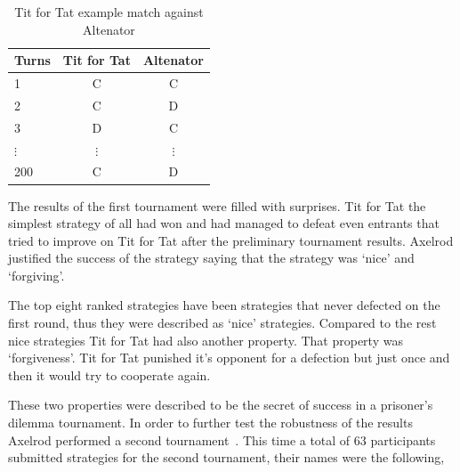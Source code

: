\documentclass{article}
\begin{document}
\begin{table}[!hbtp]
    \begin{center}
    \begin{tabular}{lcc}
        \toprule
        Turns & Tit for Tat & Altenator\\
        \toprule
        1 & C & C\\
        2 & C & D\\
        3 & D & C\\ 
        $\vdots$ & $\vdots$ & $\vdots$ \\ 
        200 & C & D \\
        \bottomrule
    \end{tabular}
    \caption{Tit for Tat example match against Altenator}\label{table:tft_vs_a}
\end{center}
\end{table}

The results of the first tournament were filled with surprises. Tit for Tat the
simplest strategy of all had won and had managed to defeat even entrants that
tried to improve on Tit for Tat after the preliminary tournament results. 
Axelrod justified the success of the strategy saying that the strategy was
`nice' and `forgiving'. 

The top eight ranked strategies have been strategies that never defected on the
first round, thus they were described as `nice' strategies. Compared to the rest
nice strategies Tit for Tat had also another property. That property was 
`forgiveness'. Tit for Tat punished it's opponent for a defection but just once
and then it would try to cooperate again.

These two properties were described to be the secret of success in a prisoner's
dilemma tournament. In order to further test the robustness of the results
Axelrod performed a second tournament~\cite{Axelrod1980b}. This time a total of
63 participants submitted strategies for the second tournament, their names were
the following,
\end{document}
